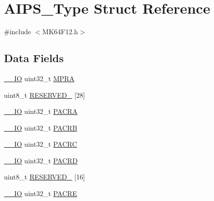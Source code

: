 \hypertarget{struct_a_i_p_s___type}{}\section{A\+I\+P\+S\+\_\+\+Type Struct Reference}
\label{struct_a_i_p_s___type}


{\ttfamily \#include $<$M\+K64\+F12.\+h$>$}

\subsection*{Data Fields}
\begin{DoxyCompactItemize}
\item 
\mbox{\hyperlink{core__cm4_8h_aec43007d9998a0a0e01faede4133d6be}{\+\_\+\+\_\+\+IO}} uint32\+\_\+t \mbox{\hyperlink{group___v_r_e_f___peripheral___access___layer_ga896a4a1f7862550beba46cd8e2e2317b}{M\+P\+RA}}
\item 
uint8\+\_\+t \mbox{\hyperlink{group___v_r_e_f___peripheral___access___layer_gabc36545658b11a98b00c51de3a3c5d42}{R\+E\+S\+E\+R\+V\+E\+D\+\_}} \mbox{[}28\mbox{]}
\item 
\mbox{\hyperlink{core__cm4_8h_aec43007d9998a0a0e01faede4133d6be}{\+\_\+\+\_\+\+IO}} uint32\+\_\+t \mbox{\hyperlink{group___v_r_e_f___peripheral___access___layer_gae1b74145d956e4f06a59881f23aaa7a3}{P\+A\+C\+RA}}
\item 
\mbox{\hyperlink{core__cm4_8h_aec43007d9998a0a0e01faede4133d6be}{\+\_\+\+\_\+\+IO}} uint32\+\_\+t \mbox{\hyperlink{group___v_r_e_f___peripheral___access___layer_ga2c740e89a51c22d18560a674a92e4f1e}{P\+A\+C\+RB}}
\item 
\mbox{\hyperlink{core__cm4_8h_aec43007d9998a0a0e01faede4133d6be}{\+\_\+\+\_\+\+IO}} uint32\+\_\+t \mbox{\hyperlink{group___v_r_e_f___peripheral___access___layer_gaf32727b5e3b99080e4b185bed4835743}{P\+A\+C\+RC}}
\item 
\mbox{\hyperlink{core__cm4_8h_aec43007d9998a0a0e01faede4133d6be}{\+\_\+\+\_\+\+IO}} uint32\+\_\+t \mbox{\hyperlink{group___v_r_e_f___peripheral___access___layer_ga230a8f141b20cdb4e7f0f2ac13661be1}{P\+A\+C\+RD}}
\item 
uint8\+\_\+t \mbox{\hyperlink{group___v_r_e_f___peripheral___access___layer_ga751eb9bad252d2a0d98a9d0f0c8ae7d4}{R\+E\+S\+E\+R\+V\+E\+D\+\_}} \mbox{[}16\mbox{]}
\item 
\mbox{\hyperlink{core__cm4_8h_aec43007d9998a0a0e01faede4133d6be}{\+\_\+\+\_\+\+IO}} uint32\+\_\+t \mbox{\hyperlink{group___v_r_e_f___peripheral___access___layer_ga35e81b01702e22944b8e8f2258f2aacd}{P\+A\+C\+RE}}

\end{DoxyCompactItemize}

